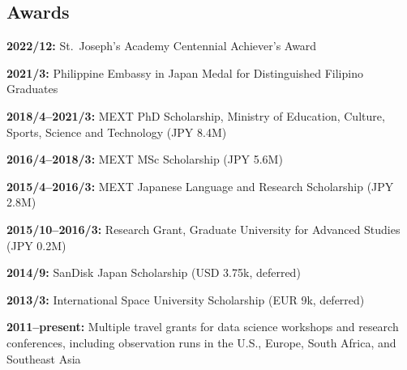 \documentclass[12pt,letterpaper]{article}
\begin{document}
%     
\fi

\subsection{Awards}
\begin{list}{}{\cvlist}
    \item \textbf{2022/12:} St.\ Joseph's Academy Centennial Achiever's Award
    \item \textbf{2021/3:} Philippine Embassy in Japan Medal for Distinguished Filipino Graduates
    \item \textbf{2018/4--2021/3:} MEXT PhD Scholarship, Ministry of Education, Culture, Sports, Science and Technology (JPY 8.4M)
    \item \textbf{2016/4--2018/3:} MEXT MSc Scholarship (JPY 5.6M)
    \item \textbf{2015/4--2016/3:} MEXT Japanese Language and Research Scholarship (JPY 2.8M)
    \item \textbf{2015/10--2016/3:} Research Grant, Graduate University for Advanced Studies (JPY 0.2M)
    \item \textbf{2014/9:} SanDisk Japan Scholarship (USD 3.75k, deferred)
    \item \textbf{2013/3:} International Space University Scholarship (EUR 9k, deferred)
    \item \textbf{2011--present:} Multiple travel grants for data science workshops and research conferences, including observation runs in the U.S., Europe, South Africa, and Southeast Asia
\end{list}
\end{document}
